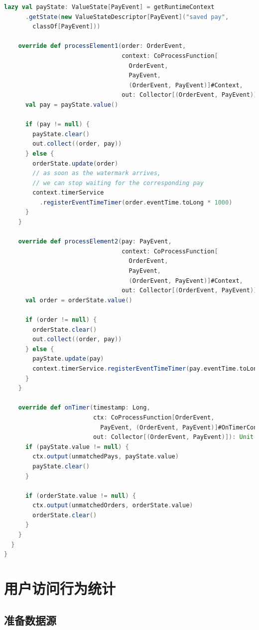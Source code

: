 \documentclass[oneside]{ctexbook}
\begin{document}
\begin{lstlisting}[language=scala]
    lazy val payState: ValueState[PayEvent] = getRuntimeContext
      .getState(new ValueStateDescriptor[PayEvent]("saved pay",
        classOf[PayEvent]))

    override def processElement1(order: OrderEvent,
                                 context: CoProcessFunction[
                                   OrderEvent,
                                   PayEvent,
                                   (OrderEvent, PayEvent)]#Context,
                                 out: Collector[(OrderEvent, PayEvent)]): Unit = {
      val pay = payState.value()

      if (pay != null) {
        payState.clear()
        out.collect((order, pay))
      } else {
        orderState.update(order)
        // as soon as the watermark arrives,
        // we can stop waiting for the corresponding pay
        context.timerService
          .registerEventTimeTimer(order.eventTime.toLong * 1000)
      }
    }

    override def processElement2(pay: PayEvent,
                                 context: CoProcessFunction[
                                   OrderEvent,
                                   PayEvent,
                                   (OrderEvent, PayEvent)]#Context,
                                 out: Collector[(OrderEvent, PayEvent)]): Unit = {
      val order = orderState.value()

      if (order != null) {
        orderState.clear()
        out.collect((order, pay))
      } else {
        payState.update(pay)
        context.timerService.registerEventTimeTimer(pay.eventTime.toLong * 1000)
      }
    }

    override def onTimer(timestamp: Long,
                         ctx: CoProcessFunction[OrderEvent,
                           PayEvent, (OrderEvent, PayEvent)]#OnTimerContext,
                         out: Collector[(OrderEvent, PayEvent)]): Unit = {
      if (payState.value != null) {
        ctx.output(unmatchedPays, payState.value)
        payState.clear()
      }

      if (orderState.value != null) {
        ctx.output(unmatchedOrders, orderState.value)
        orderState.clear()
      }
    }
  }
}
\end{lstlisting}

\section{用户访问行为统计}

\subsection{准备数据源}
\end{document}
